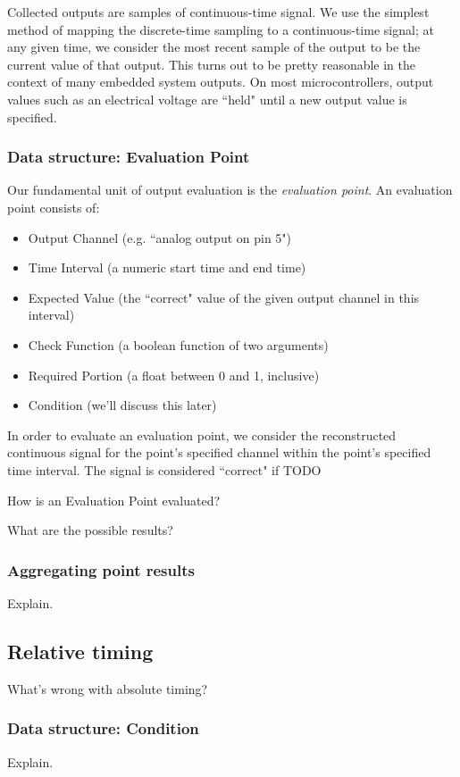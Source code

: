 \documentclass[12pt]{article}
\begin{document}
Collected outputs are samples of continuous-time signal.  We use the simplest method of mapping the discrete-time sampling to a continuous-time signal; at any given time, we consider the most recent sample of the output to be the current value of that output.  This turns out to be pretty reasonable in the context of many embedded system outputs.  On most microcontrollers, output values such as an electrical voltage are ``held" until a new output value is specified.

\subsubsection{Data structure: Evaluation Point}
Our fundamental unit of output evaluation is the \textit{evaluation point}.  An evaluation point consists of:

\begin{itemize}
\item Output Channel (e.g. ``analog output on pin 5")
\item Time Interval (a numeric start time and end time)
\item Expected Value (the ``correct" value of the given output channel in this interval)
\item Check Function (a boolean function of two arguments)
\item Required Portion (a float between 0 and 1, inclusive)
\item Condition (we'll discuss this later)
\end{itemize}

In order to evaluate an evaluation point, we consider the reconstructed continuous signal for the point's specified channel within the point's specified time interval.  The signal is considered ``correct" if TODO

How is an Evaluation Point evaluated?

What are the possible results?

\subsubsection{Aggregating point results}
Explain.

\subsection{Relative timing}
What's wrong with absolute timing?

\subsubsection{Data structure: Condition}
Explain.
\end{document}
